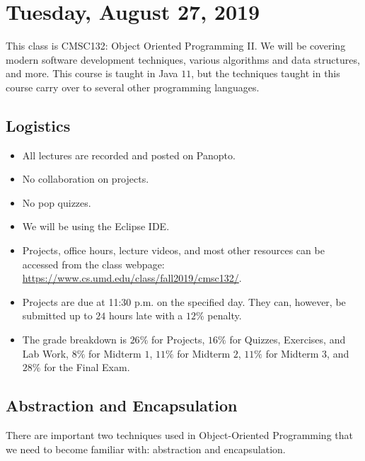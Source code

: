 \section{Tuesday, August 27, 2019}
This class is CMSC132: Object Oriented Programming II. We will be covering modern software development techniques, various algorithms and data structures, and more. This course is taught in Java $11$, but the techniques taught in this course carry over to several other programming languages.
\subsection{Logistics}
\begin{itemize}
    \item All lectures are recorded and posted on Panopto.
    \item No collaboration on projects.
    \item No pop quizzes.
    \item We will be using the Eclipse IDE.
    \item Projects, office hours, lecture videos, and most other resources can be accessed from the class webpage: \url{https://www.cs.umd.edu/class/fall2019/cmsc132/}.
    \item Projects are due at 11:30 p.m. on the specified day. They can, however, be submitted up to $24$ hours late with a $12\%$ penalty.  
    \item The grade breakdown is $26\%$ for Projects, $16\%$ for Quizzes, Exercises, and Lab Work, $8\%$ for Midterm $1$, $11\%$ for Midterm $2$, $11\%$ for Midterm $3$, and $28\%$ for the Final Exam. 
\end{itemize} 

\subsection{Abstraction and Encapsulation}
There are important two techniques used in Object-Oriented Programming that we need to become familiar with: abstraction and encapsulation. 

